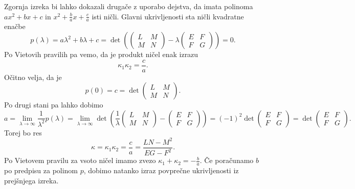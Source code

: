 \begin{opomba}
Zgornja izreka bi lahko dokazali drugače z uporabo dejstva, da imata polinoma $a x^2 + b x + c$ in $x^2 + \frac{b}{a} x + \frac{c}{a}$ isti ničli.
Glavni ukrivljenosti sta ničli kvadratne enačbe \begin{equation*}
 p(\lambda) = a \lambda^2 + b \lambda + c =  \det \left( 
   \begin{pmatrix}
 L & M \\
 M & N
 \end{pmatrix}  - \lambda \begin{pmatrix}
E & F \\
F & G
\end{pmatrix} \right) = 0.
\end{equation*}
Po Vietovih pravilih pa vemo, da je produkt ničel enak izrazu \begin{equation*}
\kappa_1 \kappa_2 = \frac{c}{a}.
\end{equation*}  
Očitno velja, da je $$p(0) = c = \det \begin{pmatrix}
L & M \\
M & N
\end{pmatrix}.$$ Po drugi stani pa lahko dobimo \begin{equation*}
a = \lim_{\lambda \to \infty} \frac{1}{\lambda^2} p(\lambda) = \lim_{\lambda \to \infty} \det \left( 
  \frac{1}{\lambda} \begin{pmatrix}
L & M \\
M & N
\end{pmatrix}  -  \begin{pmatrix}
E & F \\
F & G
\end{pmatrix} \right) = (-1)^2 \det \begin{pmatrix}
E & F \\
F & G
\end{pmatrix} = \det \begin{pmatrix}
  E & F \\
  F & G
  \end{pmatrix}.
\end{equation*}
Torej bo res \begin{equation*}
\kappa = \kappa_1 \kappa_2 = \frac{c}{a} = \frac{LN - M^2}{EG - F^2}.
\end{equation*}
Po Vietovem pravilu za vsoto ničel imamo zvezo $\kappa_1 + \kappa_2 = -\frac{b}{a}$. Če poračunamo
$b$ po predpisu za polinom $p$, dobimo natanko izraz povprečne ukrivljenosti iz prejšnjega izreka. 
\end{opomba}

